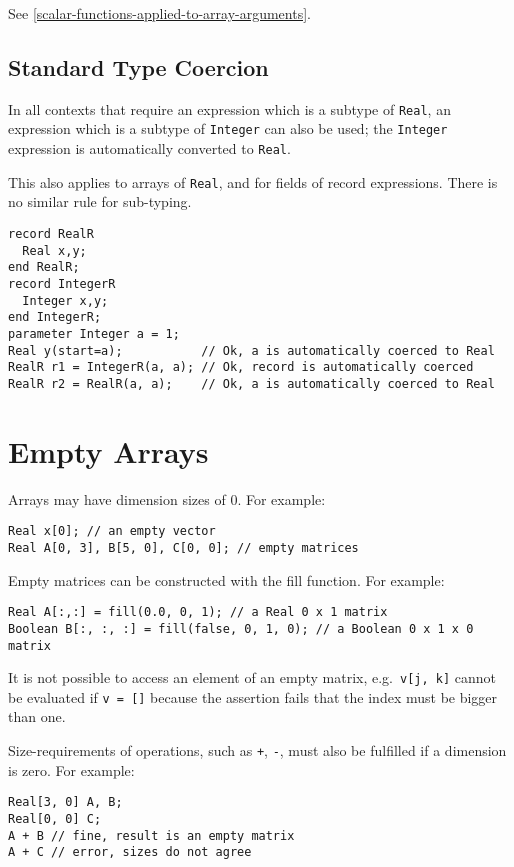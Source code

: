 See \cref{scalar-functions-applied-to-array-arguments}.

\subsection{Standard Type Coercion}\label{standard-type-coercion}
In all contexts that require an expression which is a subtype of \lstinline!Real!, an expression which is a subtype of \lstinline!Integer! can also be used;
the \lstinline!Integer! expression is automatically converted to \lstinline!Real!.

This also applies to arrays of \lstinline!Real!, and for fields of record expressions.  There is no similar rule for sub-typing.

\begin{example}
\begin{lstlisting}[language=modelica]
record RealR
  Real x,y;
end RealR;
record IntegerR
  Integer x,y;
end IntegerR;
parameter Integer a = 1;
Real y(start=a);           // Ok, a is automatically coerced to Real
RealR r1 = IntegerR(a, a); // Ok, record is automatically coerced
RealR r2 = RealR(a, a);    // Ok, a is automatically coerced to Real
\end{lstlisting}
\end{example}

\section{Empty Arrays}\label{empty-arrays}

Arrays may have dimension sizes of 0.  For example:
\begin{lstlisting}[language=modelica]
Real x[0]; // an empty vector
Real A[0, 3], B[5, 0], C[0, 0]; // empty matrices
\end{lstlisting}

Empty matrices can be constructed with the fill function.  For example:
\begin{lstlisting}[language=modelica]
Real A[:,:] = fill(0.0, 0, 1); // a Real 0 x 1 matrix
Boolean B[:, :, :] = fill(false, 0, 1, 0); // a Boolean 0 x 1 x 0 matrix
\end{lstlisting}

It is not possible to access an element of an empty matrix, e.g.\ \lstinline!v[j, k]! cannot be evaluated if \lstinline!v = []! because the assertion fails
that the index must be bigger than one.

Size-requirements of operations, such as \lstinline!+!, \lstinline!-!, must also be fulfilled if a dimension is zero.  For example:
\begin{lstlisting}[language=modelica]
Real[3, 0] A, B;
Real[0, 0] C;
A + B // fine, result is an empty matrix
A + C // error, sizes do not agree
\end{lstlisting}

